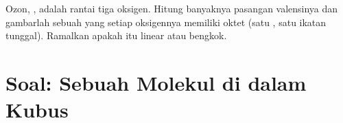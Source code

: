\begin{exercise}[$\star\star\star$]\label{exo:g10:lewis-and-shape:15}
Ozon, , adalah rantai tiga  oksigen. Hitung banyaknya
pasangan valensinya dan gambarlah sebuah  yang setiap
oksigennya memiliki oktet (satu , satu ikatan
tunggal). Ramalkan apakah  itu linear atau bengkok.
\end{exercise}

\section{Soal: Sebuah Molekul di dalam Kubus}


